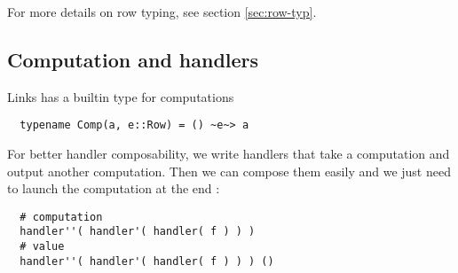 \documentclass[nonacm=true, language=french, language=english]{acmart}
\begin{document}
For more details on row typing, see section \ref{sec:row-typ}.

\subsection{Computation and handlers}
\label{sec:computation-handlers}
Links has a builtin type for computations
\begin{lstlisting}
  typename Comp(a, e::Row) = () ~e~> a
\end{lstlisting}

For better handler composability, we write handlers that take a computation and output another computation. Then we can compose them easily and we just need to launch the computation at the end :
\begin{lstlisting}
  # computation
  handler''( handler'( handler( f ) ) )
  # value
  handler''( handler'( handler( f ) ) ) ()
\end{lstlisting}
\end{document}
